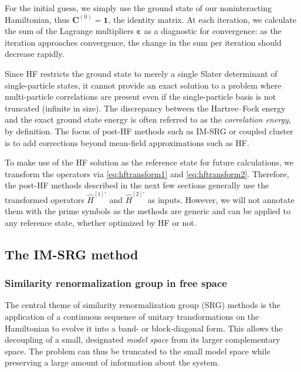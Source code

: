 For the initial guess, we simply use the ground state of our noninteracting Hamiltonian, thus $\bm{C}^{(0)} = \bm{1}$, the identity matrix.  At each iteration, we calculate the sum of the Lagrange multipliers $\bm{\varepsilon}$ as a diagnostic for convergence: as the iteration approaches convergence, the change in the sum per iteration should decrease rapidly.

Since HF restricts the ground state to merely a single Slater determinant of single-particle states, it cannot provide an exact solution to a problem where multi-particle correlations are present even if the single-particle basis is not truncated (infinite in size).  The discrepancy between the Hartree--Fock energy and the exact ground state energy is often referred to as the \textit{correlation energy}, by definition.  The focus of post-HF methods such as IM-SRG or coupled cluster is to add corrections beyond mean-field approximations such as HF.

To make use of the HF solution as the reference state for future calculations, we transform the operators via \eqref{eq:hftransform1} and \eqref{eq:hftransform2}.  Therefore, the post-HF methods described in the next few sections generally use the transformed operators $\hat{H}^{[1] \prime}$ and $\hat{H}^{[2] \prime}$ as inputs.  However, we will not annotate them with the prime symbols as the methods are generic and can be applied to any reference state, whether optimized by HF or not.

\subsection{The IM-SRG method}
\label{subsec:imsrgmethod}

\subsubsection{Similarity renormalization group in free space}
\label{subsubsec:srgmethods}

The central theme of similarity renormalization group (SRG) methods is the application of a continuous sequence of unitary transformations on the Hamiltonian to evolve it into a band- or block-diagonal form.  This allows the decoupling of a small, designated \textit{model space} from its larger complementary space.  The problem can thus be truncated to the small model space while preserving a large amount of information about the system.

